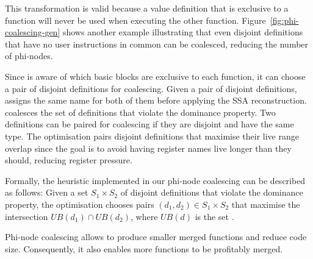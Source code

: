 This transformation is valid because a value definition that
is exclusive to a function will never be used when executing
the other function.
Figure~\ref{fig:phi-coalescing-gen} shows another example
illustrating that even disjoint definitions that have no user instructions
in common can be coalesced, reducing the number of phi-nodes.

Since {\ProjName} is aware of which basic blocks are exclusive to each function, it can choose a pair of disjoint definitions for
coalescing. Given a pair of disjoint definitions, {\ProjName} assigns the same name for both of them before applying the SSA
reconstruction. {\ProjName} coalesces the set of definitions that violate the dominance property. Two definitions can be paired for
coalescing if they are disjoint and have the same type. The optimisation pairs disjoint definitions that maximise their live range overlap
since the goal is to avoid having register names live longer than they should, reducing register pressure.

Formally, the heuristic implemented in our phi-node coalescing can be described as follows:
Given a set $S_1\times S_2$ of disjoint definitions that violate the dominance property,
the optimisation chooses pairs $(d_1,d_2)\in S_1\times S_2$ that maximise the intersection $U\!B(d_1)\cap U\!B(d_2)$,
where $U\!B(d)$ is the set .

Phi-node coalescing allows {\ProjName} to produce smaller merged functions and reduce code size.
Consequently, it also enables more functions to be profitably merged.
